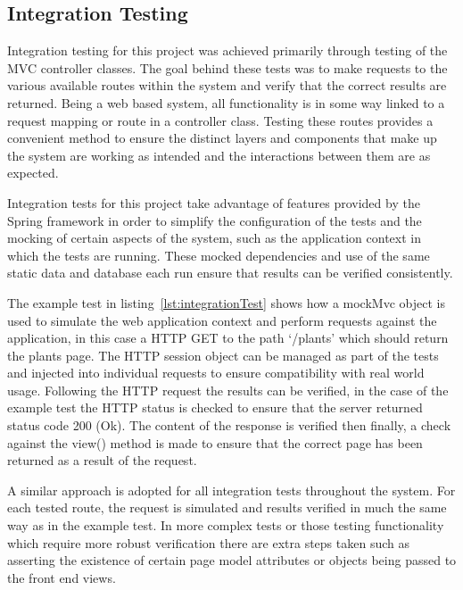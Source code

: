 \subsection{Integration Testing}

Integration testing for this project was achieved primarily through testing of the MVC controller classes. The goal behind these tests was to make requests to the various available routes within the system and verify that the correct results are returned. Being a web based system, all functionality is in some way linked to a request mapping or route in a controller class. Testing these routes provides a convenient method to ensure the distinct layers and components that make up the system are working as intended and the interactions between them are as expected. 

Integration tests for this project take advantage of features provided by the Spring framework in order to simplify the configuration of the tests and the mocking of certain aspects of the system, such as the application context in which the tests are running. These mocked dependencies and use of the same static data and database each run ensure that results can be verified consistently.

 The example test in listing~\ref{lst:integrationTest} shows how a mockMvc object is used to simulate the web application context and perform requests against the application, in this case a HTTP GET to the path `/plants' which should return the plants page. The HTTP session object can be managed as part of the tests and injected into individual requests to ensure compatibility with real world usage. Following the HTTP request the results can be verified, in the case of the example test the HTTP status is checked to ensure that the server returned status code 200 (Ok). The content of the response is verified then finally, a check against the view() method is made to ensure that the correct page has been returned as a result of the request. 



A similar approach is adopted for all integration tests throughout the system. For each tested route, the request is simulated and results verified in much the same way as in the example test. In more complex tests or those testing functionality which require more robust verification there are extra steps taken such as asserting the existence of certain page model attributes or objects being passed to the front end views.


